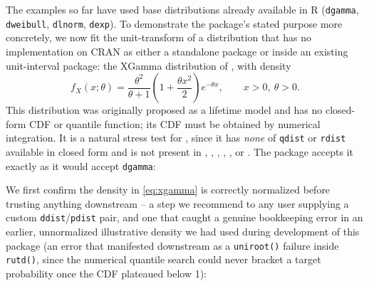 The examples so far have used base distributions already available in
R (\texttt{dgamma}, \texttt{dweibull}, \texttt{dlnorm}, \texttt{dexp}).
To demonstrate the package's stated purpose more concretely, we now fit
the unit-transform of a distribution that has no implementation on
CRAN as either a standalone package or inside an existing unit-interval
package: the XGamma distribution of \citet{sen2016xgamma}, with density
\begin{equation}
  f_X(x;\theta) = \frac{\theta^2}{\theta+1}\left(1+\frac{\theta x^2}{2}\right)e^{-\theta x},
  \qquad x>0,\ \theta>0.
  \label{eq:xgamma}
\end{equation}
This distribution was originally proposed as a lifetime model and has
no closed-form CDF or quantile function; its CDF must be obtained by
numerical integration. It is a natural stress test for
, since it has \emph{none} of \texttt{qdist} or
\texttt{rdist} available in closed form and is not present in
, , , ,
, or . The package accepts it exactly as it
would accept \texttt{dgamma}:


We first confirm the density in \eqref{eq:xgamma} is correctly
normalized before trusting anything downstream -- a step we recommend
to any user supplying a custom \texttt{ddist}/\texttt{pdist} pair, and
one that caught a genuine bookkeeping error in an earlier,
unnormalized illustrative density we had used during development of
this package (an error that manifested downstream as a
\texttt{uniroot()} failure inside \texttt{rutd()}, since the numerical
quantile search could never bracket a target probability once the CDF
plateaued below 1):


